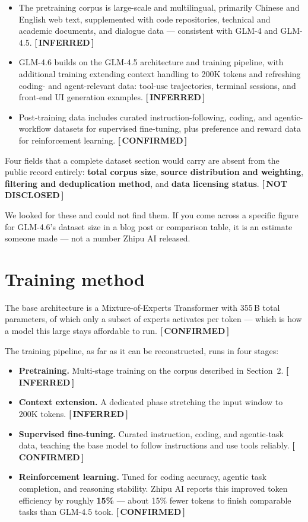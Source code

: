 \documentclass[11pt,a4paper]{article}
\newcommand{\tg}[2]{{\scriptsize\sffamily\bfseries\color{#1}[\,#2\,]}}
\newcommand{\Conf}{\tg{moss}{CONFIRMED}}
\newcommand{\Infr}{\tg{clay}{INFERRED}}
\newcommand{\Undi}{\tg{stone}{NOT DISCLOSED}}
\begin{document}
\begin{itemize}
  \item The pretraining corpus is large-scale and multilingual, primarily Chinese and English
        web text, supplemented with code repositories, technical and academic documents, and
        dialogue data --- consistent with GLM-4 and GLM-4.5. \Infr
  \item GLM-4.6 builds on the GLM-4.5 architecture and training pipeline, with additional
        training extending context handling to 200K tokens and refreshing coding- and
        agent-relevant data: tool-use trajectories, terminal sessions, and front-end UI
        generation examples. \Infr
  \item Post-training data includes curated instruction-following, coding, and agentic-workflow
        datasets for supervised fine-tuning, plus preference and reward data for reinforcement
        learning. \Conf
\end{itemize}

Four fields that a complete dataset section would carry are absent from the public record
entirely: \textbf{total corpus size}, \textbf{source distribution and weighting},
\textbf{filtering and deduplication method}, and \textbf{data licensing status}. \Undi

\begin{aside}
We looked for these and could not find them. If you come across a specific figure for GLM-4.6's
dataset size in a blog post or comparison table, it is an estimate someone made --- not a number
Zhipu AI released.
\end{aside}

\section{Training method}

The base architecture is a Mixture-of-Experts Transformer with 355\,B total parameters, of which
only a subset of experts activates per token --- which is how a model this large stays
affordable to run. \Conf

The training pipeline, as far as it can be reconstructed, runs in four stages:

\begin{itemize}
  \item \textbf{Pretraining.} Multi-stage training on the corpus described in Section~2. \Infr
  \item \textbf{Context extension.} A dedicated phase stretching the input window to 200K
        tokens. \Infr
  \item \textbf{Supervised fine-tuning.} Curated instruction, coding, and agentic-task data,
        teaching the base model to follow instructions and use tools reliably. \Conf
  \item \textbf{Reinforcement learning.} Tuned for coding accuracy, agentic task completion, and
        reasoning stability. Zhipu AI reports this improved token efficiency by roughly
        \textbf{15\%} --- about 15\% fewer tokens to finish comparable tasks than GLM-4.5
        took. \Conf
\end{itemize}
\end{document}
